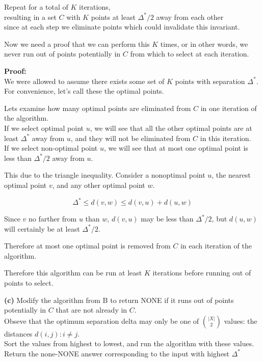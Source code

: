 \documentclass[11pt]{article}
\renewcommand{\part}[1] {\vspace{.10in} {\bf (#1)}}
\begin{document}
Repeat for a total of $K$ iterations,\\
resulting in a set $C$ with $K$ points at least $\Delta^{*} / 2$ away from each other\\
since at each step we eliminate points which could invalidate this invariant.

Now we need a proof that we can perform this $K$ times, or in other words, we never run out of points potentially in $C$ from which to select at each iteration.

\textbf{Proof:}\\
We were allowed to assume there exists some set of $K$ points with separation $\Delta^{*}$.\\
For convenience, let's call these the optimal points.

Lets examine how many optimal points are eliminated from $C$ in one iteration of the algorithm.\\
If we select optimal point $u$, we will see that all the other optimal points are at least $\Delta^{*}$ away from $u$, and they will not be eliminated from $C$ in this iteration.\\
If we select non-optimal point $u$, we will see that at most one optimal point is less than $\Delta^{*} / 2$ away from $u$.

This due to the triangle inequality. Consider a nonoptimal point $u$, the nearest optimal point $v$, and any other optimal point $w$.

$$\Delta^{*} \leq d(v,w) \leq d(v,u) + d(u,w)$$

Since $v$ no farther from  $u$ than $w$, $d(v,u)$ may be less than $\Delta^{*} / 2$, but $d(u,w)$ will certainly be at least $\Delta^{*} / 2$.

Therefore at most one optimal point is removed from $C$ in each iteration of the algorithm.

Therefore this algorithm can be run at least $K$ iterations before running out of points to select.

\part{c}
Modify the algorithm from B to return NONE if it runs out of points potentially in $C$ that are not already in $C$.\\
Obseve that the optimum separation delta may only be one of $\binom{|X|}{2}$ values: the distances $d(i,j) : i \neq j$.\\
Sort the values from highest to lowest, and run the algorithm with these values.\\
Return the none-NONE answer corresponding to the input with highest $\Delta^{*}$
\end{document}

